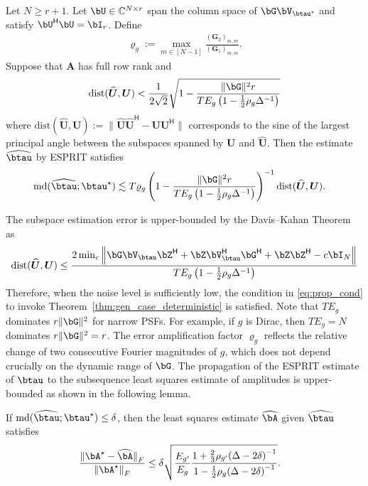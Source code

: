 \documentclass[conference,english]{IEEEtran}
\begin{document}
\begin{theorem}
\label{thm:gen_case_deterministic}
Let $N \geq r+1$. Let $\bU \in \mathbb{C}^{N \times r}$ span the column space of $\bG \bV_{\btau^\star}$ and
satisfy $\bU^\mathsf{H} \bU = \bI_r$.
Define 
\begin{align*}
    \varrho_g := \max_{m \in [N-1]}\frac{(\bm{G}_2)_{m,m}}{(\bm{G}_1)_{m,m}}. 
\end{align*}
Suppose that $\bm A$ has full row rank and
\begin{align}
\label{eq:prop_cond}
\mathrm{dist}(\bm{\widehat{U}},\bm U)
< \frac{1}{2\sqrt{2}} \sqrt{1 - \frac{\|\bG\|^2 r}{TE_{g} \left(1 - \frac{1}{2} \rho_g \Delta^{-1} \right) }} 
\end{align}
where $\mathrm{dist}(\bm{\widehat{U}},{\bm{U}}) :=
\|\widehat{\bm U} \widehat{\bm U}^\mathsf{H} - \bm{U} \bm{U}^\mathsf{H}\|$ corresponds to the sine of the largest principal angle between the subspaces spanned by $\bm{U}$ and $\widehat{\bm U}$. 
Then the estimate $\widehat{\btau}$ by ESPRIT satisfies
\begin{align}
\label{eq:md_tau_deterministic}
\mathrm{md}(\widehat{\btau} ; \btau^\star)  
& \lesssim T \varrho_g
\left(1 - \frac{\|\bG\|^2 r}{TE_{g} \left(1 - \frac{1}{2} \rho_g \Delta^{-1} \right)}\right)^{-1} \mathrm{dist}(\bm{\widehat{U}},\bm U).
\end{align}
\end{theorem}
The subspace estimation error is upper-bounded by the Davis--Kahan Theorem~\cite{davis1970rotation} as
\begin{align} \label{eq:daviskahan_fs2}
\mathrm{dist}(\bm{\widehat{U}},\bm{U}) 
\leq \frac{2 \min_c \norm{\bG \bV_{\btau} \bZ^\mathsf{H} + \bZ \bV_{\btau}^\mathsf{H} \bG^\mathsf{H} + \bZ \bZ^\mathsf{H} - c \bI_N}}{TE_{g} \left(1 - \frac{1}{2} \rho_g \Delta^{-1} \right)}
\end{align}
Therefore, when the noise level is sufficiently low, the condition in \eqref{eq:prop_cond} to invoke Theorem~\ref{thm:gen_case_deterministic} is satisfied. 
Note that $T E_g$ dominates $r \|\bG\|^2$ for narrow PSFs. For example, if $g$ is Dirac, then $T E_g = N$ dominates $r \|\bG\|^2 = r$. 
The error amplification factor $\varrho_g$ reflects the relative change of two consecutive Fourier magnitudes of $g$, which does not depend crucially on the dynamic range of $\bG$. 
The propagation of the ESPRIT estimate of $\btau$ to the subsequence least squares estimate of amplitudes is upper-bounded as shown in the following lemma. 
\begin{lemma}\label{lem:bound_a}
If $\mathrm{md}(\widehat{\btau} ; \btau^\star) \leq \delta$, then the least squares estimate $\widehat{\bA}$ given $\widehat{\btau}$ satisfies
\begin{align*}
 \frac{{\|\bA^\star - \widehat{\bA}\|}_F}{{\|\bA^\star\|}_F} &\leq \delta \sqrt{\frac{E_{g^\prime}}{E_g} \frac{1 + \frac{2}{3} \rho_{g^\prime} {(\Delta-2\delta)}^{-1}}{1 - \frac{1}{2}\rho_g {(\Delta-2\delta)}^{-1}}}.
\end{align*}

\end{lemma}
\end{document}
